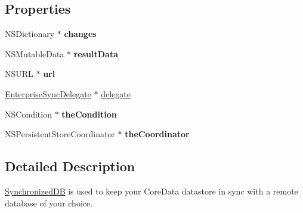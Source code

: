 \subsection*{Properties}
\begin{DoxyCompactItemize}
\item 
\hypertarget{interface_synchronized_d_b_aa097f0d41197c070ebdfbc8360a8fa80}{
NSDictionary $\ast$ {\bfseries changes}}
\label{interface_synchronized_d_b_aa097f0d41197c070ebdfbc8360a8fa80}

\item 
\hypertarget{interface_synchronized_d_b_a55c10bab67551d6a5ef01b68c26d0ec8}{
NSMutableData $\ast$ {\bfseries resultData}}
\label{interface_synchronized_d_b_a55c10bab67551d6a5ef01b68c26d0ec8}

\item 
\hypertarget{interface_synchronized_d_b_aec66a0cfec8423dd926db4ae2b8424d6}{
NSURL $\ast$ {\bfseries url}}
\label{interface_synchronized_d_b_aec66a0cfec8423dd926db4ae2b8424d6}

\item 
\hyperlink{protocol_enterprise_sync_delegate-p}{EnterpriseSyncDelegate} $\ast$ \hyperlink{interface_synchronized_d_b_acbfdffd28abc8f60b10b07b8c4053572}{delegate}
\item 
\hypertarget{interface_synchronized_d_b_adea2929e2ab070ec8faa86e9c071ce90}{
NSCondition $\ast$ {\bfseries theCondition}}
\label{interface_synchronized_d_b_adea2929e2ab070ec8faa86e9c071ce90}

\item 
\hypertarget{interface_synchronized_d_b_a041ee3472dabb6975b135e01bac7abaf}{
NSPersistentStoreCoordinator $\ast$ {\bfseries theCoordinator}}
\label{interface_synchronized_d_b_a041ee3472dabb6975b135e01bac7abaf}

\end{DoxyCompactItemize}


\subsection{Detailed Description}
\hyperlink{interface_synchronized_d_b}{SynchronizedDB} is used to keep your CoreData datastore in sync with a remote database of your choice. 

